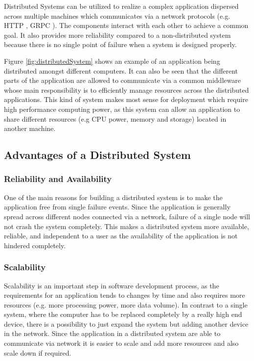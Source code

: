    \par
    Distributed Systems can be utilized to realize a complex application dispersed across
    multiple machines which communicates via a network protocols (e.g. HTTP \cite{HTTP}, 
    GRPC \cite{grpc}). The 
    components interact with each other to achieve a common goal. It also provides
    more reliability compared to a non-distributed system because there is no single point
    of failure when a system is designed properly. 

    \par
    Figure \ref{fig:distributedSystem} shows an example of an application being 
    distributed amongst different computers. It can also be seen that the different parts of the application are allowed
    to communicate via a common middleware whose main responsibility is to
    efficiently manage resources across the distributed applications. This kind of system
    makes most sense for deployment which require high performance computing power, as this system can allow an application to share different
    resources (e.g CPU power, memory and storage) located in another machine.



    
        
    \subsection{Advantages of a Distributed System} 
        \subsubsection{Reliability and Availability}
        One of the main reasons for building a distributed system is to make the application free from single failure events.
        Since the application is generally spread across different nodes connected via a network, failure of a single node will not 
        crash the system completely. This makes a distributed system more available, reliable, and independent to a user as the availability
        of the application is not hindered completely.
        
        \subsubsection{Scalability}
        Scalability is an important step in software development process, as the requirements for an application tends to changes by time and also requires more resources
        (e.g. more processing power, more data volume). 
        In contrast to a single system, where the computer 
        has to be replaced completely by a really high end device, there is a possibility to just expand the system but adding another device in the network.
        Since the application in a distributed system are able to communicate via network it is easier to scale and add more resources and 
        also scale down if required. 
    
